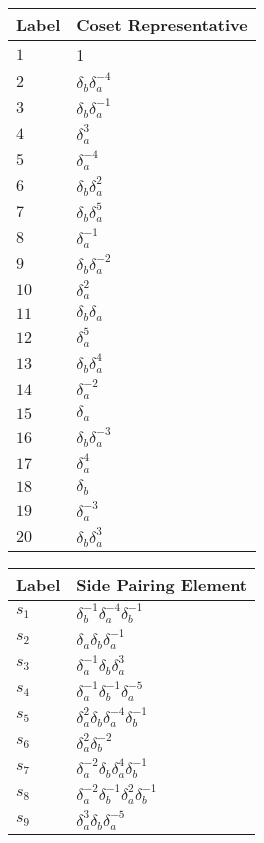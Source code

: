 \documentclass{article}
\begin{document}
\begin{center}
\begin{tabular}{ll}
\toprule
Label & Coset Representative\\
\midrule
$1$ & 1 \\
$2$ & $\delta_b^{}\delta_a^{-4}$ \\
$3$ & $\delta_b^{}\delta_a^{-1}$ \\
$4$ & $\delta_a^{3}$ \\
$5$ & $\delta_a^{-4}$ \\
$6$ & $\delta_b^{}\delta_a^{2}$ \\
$7$ & $\delta_b^{}\delta_a^{5}$ \\
$8$ & $\delta_a^{-1}$ \\
$9$ & $\delta_b^{}\delta_a^{-2}$ \\
$10$ & $\delta_a^{2}$ \\
$11$ & $\delta_b^{}\delta_a^{}$ \\
$12$ & $\delta_a^{5}$ \\
$13$ & $\delta_b^{}\delta_a^{4}$ \\
$14$ & $\delta_a^{-2}$ \\
$15$ & $\delta_a^{}$ \\
$16$ & $\delta_b^{}\delta_a^{-3}$ \\
$17$ & $\delta_a^{4}$ \\
$18$ & $\delta_b^{}$ \\
$19$ & $\delta_a^{-3}$ \\
$20$ & $\delta_b^{}\delta_a^{3}$ \\
\bottomrule
\end{tabular}
\hfill
\begin{tabular}{ll}
\toprule
Label & Side Pairing Element\\
\midrule
$s_{1}$ & $\delta_b^{-1}\delta_a^{-4}\delta_b^{-1}$ \\
$s_{2}$ & $\delta_a^{}\delta_b^{}\delta_a^{-1}$ \\
$s_{3}$ & $\delta_a^{-1}\delta_b^{}\delta_a^{3}$ \\
$s_{4}$ & $\delta_a^{-1}\delta_b^{-1}\delta_a^{-5}$ \\
$s_{5}$ & $\delta_a^{2}\delta_b^{}\delta_a^{-4}\delta_b^{-1}$ \\
$s_{6}$ & $\delta_a^{2}\delta_b^{-2}$ \\
$s_{7}$ & $\delta_a^{-2}\delta_b^{}\delta_a^{4}\delta_b^{-1}$ \\
$s_{8}$ & $\delta_a^{-2}\delta_b^{-1}\delta_a^{2}\delta_b^{-1}$ \\
$s_{9}$ & $\delta_a^{3}\delta_b^{}\delta_a^{-5}$ \\

\end{tabular}
\end{center}
\end{document}
